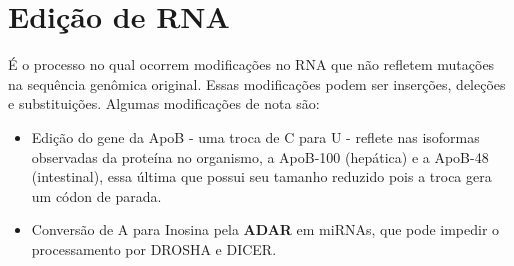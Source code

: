 \documentclass[
]{book}
\begin{document}
\hypertarget{ediuxe7uxe3o-de-rna}{%
\section{Edição de RNA}\label{ediuxe7uxe3o-de-rna}}

É o processo no qual ocorrem modificações no RNA que não refletem mutações na sequência genômica original. Essas modificações podem ser inserções, deleções e substituições. Algumas modificações de nota são:

\begin{itemize}
\item
  Edição do gene da ApoB - uma troca de C para U - reflete nas isoformas observadas da proteína no organismo, a ApoB-100 (hepática) e a ApoB-48 (intestinal), essa última que possui seu tamanho reduzido pois a troca gera um códon de parada.
\item
  Conversão de A para Inosina pela \textbf{ADAR} em miRNAs, que pode impedir o processamento por DROSHA e DICER.
\end{itemize}

  
\end{document}
